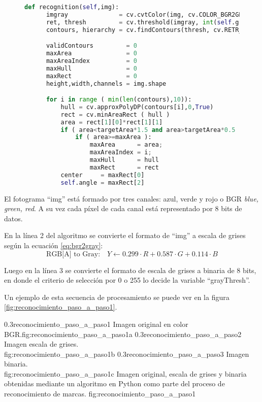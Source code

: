 \begin{figure}[h]
   \begin{lstlisting}[language=python,caption={Algoritmo principal de reconocimiento de marcas en un fotograma},label={cod:reconocimiento2}]
def recognition(self,img):
      imgray              = cv.cvtColor(img, cv.COLOR_BGR2GRAY)
      ret, thresh         = cv.threshold(imgray, int(self.grayThresh), 0xff, cv.THRESH_BINARY_INV)
      contours, hierarchy = cv.findContours(thresh, cv.RETR_EXTERNAL, cv.CHAIN_APPROX_SIMPLE)

      validContours         = 0
      maxArea               = 0
      maxAreaIndex          = 0
      maxHull               = 0
      maxRect               = 0
      height,width,channels = img.shape

      for i in range ( min(len(contours),10)):
          hull = cv.approxPolyDP(contours[i],0,True) 
          rect = cv.minAreaRect ( hull )
          area = rect[1][0]*rect[1][1]
          if ( area<targetArea*1.5 and area>targetArea*0.5 ):
              if ( area>=maxArea ):
                  maxArea      = area;
                  maxAreaIndex = i;
                  maxHull      = hull
                  maxRect      = rect
          center     = maxRect[0]
          self.angle = maxRect[2]
   \end{lstlisting}
\end{figure}

El fotograma ``img'' está formado por tres canales: azul, verde y rojo o BGR \textit{blue, green, red}.
A su vez cada píxel de cada canal está representado por 8 bits de datos. \par
En la línea 2 del algoritmo se convierte el formato de ``img'' a escala de grises según la ecuación \ref{eq:bgr2gray}:
\begin{equation}
   \text{RGB[A] to Gray:} \quad Y \leftarrow 0.299 \cdot R + 0.587 \cdot G + 0.114 \cdot B
   \label{eq:bgr2gray}
\end{equation}

  Luego en la línea 3 se convierte el formato de escala de grises a binaria de 8 bits, en donde el criterio de selección por 0 o 255 lo decide la variable ``grayThresh''.\par
  Un ejemplo de esta secuencia de procesamiento se puede ver en la figura \ref{fig:reconocimiento_paso_a_paso1}.

\subfigabc
         {0.3}{reconocimiento_paso_a_paso1} {Imagen original en color BGR.}{fig:reconocimiento_paso_a_paso1a}
         {0.3}{reconocimiento_paso_a_paso2} {Imagen escala de grises. \\ \vphantom{1}}{fig:reconocimiento_paso_a_paso1b}
         {0.3}{reconocimiento_paso_a_paso3} {Imagen binaria.\\ \vphantom{1}}{fig:reconocimiento_paso_a_paso1c}
         {Imagen original, escala de grises y binaria obtenidas mediante un algoritmo en Python como parte del proceso de reconocimiento de marcas.}
         {fig:reconocimiento_paso_a_paso1}


